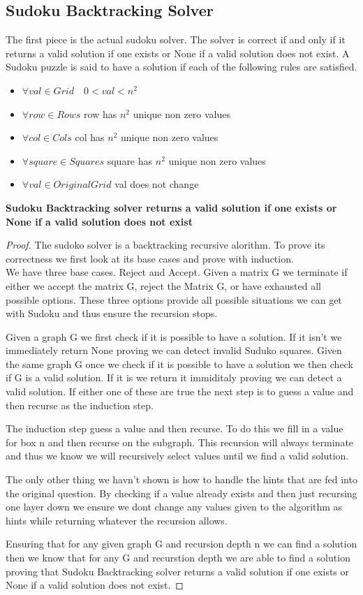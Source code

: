 \documentclass{sig-alternate}
\begin{document}
\subsection{Sudoku Backtracking Solver}
The first piece is the actual sudoku solver. The solver is correct if and only if it returns a valid solution if one exists or None if a valid solution does not exist. A Sudoku puzzle is said to have a solution if each of the following rules are satisfied. 
\begin{itemize}
\item{$\forall val \in Grid \quad 0 < val < n^2$} 
\item{$\forall row \in Rows$ row has $n^2$ unique non zero values}
\item{$\forall col \in Cols$ col has $n^2$ unique non zero values}
\item{$\forall square \in Squares$ square has $n^2$ unique non zero values}
\item{$\forall val \in Original Grid$ val does not change}
\end{itemize}
\textbf{Sudoku Backtracking solver returns a valid solution if one exists or None if a valid solution does not exist}
\begin{proof}
The sudoko solver is a backtracking recursive alorithm. To prove its correctness we first look at its base cases and prove with induction. \\ 

We have three base cases. Reject and Accept. Given a matrix G we terminate if either we accept the matrix G, reject the Matrix G, or have exhausted all possible options. These three options provide all possible situations we can get with Sudoku and thus ensure the recursion stops.

Given a graph G we first check if it is possible to have a solution. If it isn't we immediately return None proving we can detect invalid Suduko squares. Given the same graph G once we check if it is possible to have a solution we then check if G is a valid solution. If it is we return it immiditaly proving we can detect a valid solution. If either one of these are true the next step is to guess a value and then recurse as the induction step.

The induction step guess a value and then recurse. To do this we fill in a value for box n and then recurse on the subgraph. This recursion will always terminate and thus we know we will recursively select values until we find a valid solution. 

The only other thing we havn't shown is how to handle the hints that are fed into the original question. By checking if a value already exists and then just recursing one layer down we ensure we dont change any values given to the algorithm as hints while returning whatever the recursion allows. 

Ensuring that for any given graph G and recursion depth n we can find a solution then we know that for any G and recurstion depth we are able to find a solution proving that Sudoku Backtracking solver returns a valid solution if one exists or None if a valid solution does not exist.
\end{proof}
\end{document}
